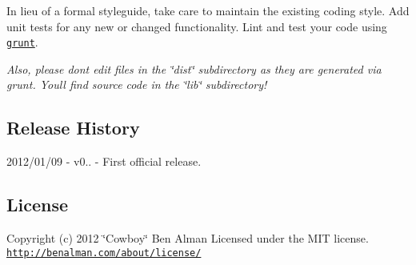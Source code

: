 In lieu of a formal styleguide, take care to maintain the existing coding style. Add unit tests for any new or changed functionality. Lint and test your code using \href{https://github.com/cowboy/grunt}{\tt grunt}.

{\itshape Also, please don\textquotesingle{}t edit files in the \char`\"{}dist\char`\"{} subdirectory as they are generated via grunt. You\textquotesingle{}ll find source code in the \char`\"{}lib\char`\"{} subdirectory!}

\subsection*{Release History}

2012/01/09 -\/ v0.. -\/ First official release.

\subsection*{License}

Copyright (c) 2012 \char`\"{}\+Cowboy\char`\"{} Ben Alman Licensed under the M\+IT license. \href{http://benalman.com/about/license/}{\tt http\+://benalman.\+com/about/license/} 